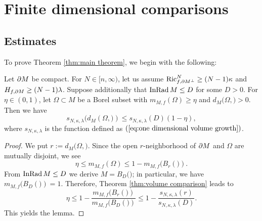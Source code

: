 \section{Finite dimensional comparisons}\label{sec:Comparisons}

\subsection{Estimates}
To prove Theorem \ref{thm:main theorem},
we begin with the following:
\begin{lem}\label{lem:key lemma}
Let $\partial M$ be compact.
For $N\in [n,\infty)$,
let us assume $\operatorname{Ric}^{N}_{f,\partial M^{\perp}}\geq (N-1)\kappa$ and $H_{f,\partial M} \geq (N-1)\lambda$.
Suppose additionally that
$\operatorname{InRad} M\leq D$ for some $D>0$.
For $\eta \in (0,1)$,
let $\Omega \subset M$ be a Borel subset with $m_{M,f}(\Omega)\geq \eta$ and $d_{M}(\Omega,\bm)>0$.
Then we have
\begin{equation*}
s_{N,\kappa,\lambda}(d_{M}(\Omega,\bm)) \leq s_{N,\kappa,\lambda}(D)(1-\eta),
\end{equation*} 
where $s_{N,\kappa,\lambda}$ is the function defined as $(\ref{eq:one dimensional volume growth})$.
\end{lem}
\begin{proof}
We put $r:=d_{M}(\Omega,\bm)$.
Since the open $r$-neighborhood of $\partial M$ and $\Omega$ are mutually disjoint,
we see
\begin{equation*}
\eta \leq m_{M,f}(\Omega)\leq 1-m_{M,f}(B_{r}(\bm)).
\end{equation*}
From $\operatorname{InRad} M\leq D$
we derive $M=B_{D}(\bm)$;
in particular,
we have $m_{M,f}(B_{D}(\bm))=1$.
Therefore,
Theorem \ref{thm:volume comparison} leads to
\begin{equation*}
\eta \leq 1-\frac{m_{M,f}(B_{r}(\bm))}{m_{M,f}(B_{D}(\bm))}\leq 1-\frac{s_{N,\kappa,\lambda}(r)}{s_{N,\kappa,\lambda}(D)}.
\end{equation*}
This yields the lemma.
\end{proof}

